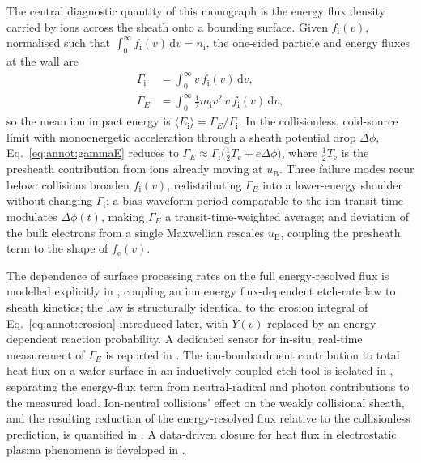 The central diagnostic quantity of this monograph is the energy flux density carried by ions across the sheath onto a bounding surface. Given $f_{\mathrm{i}}(v)$, normalised such that $\int_{0}^{\infty} f_{\mathrm{i}}(v)\,\mathrm{d}v = n_{\mathrm{i}}$, the one-sided particle and energy fluxes at the wall are
\begin{align}
\Gamma_{\mathrm{i}} &= \int_{0}^{\infty} v\, f_{\mathrm{i}}(v)\, \mathrm{d}v, \label{eq:annot:gammai}\\
\Gamma_{E} &= \int_{0}^{\infty} \tfrac{1}{2} m_{\mathrm{i}} v^{2}\, v\, f_{\mathrm{i}}(v)\, \mathrm{d}v, \label{eq:annot:gammaE}
\end{align}
so the mean ion impact energy is $\langle E_{\mathrm{i}} \rangle = \Gamma_{E}/\Gamma_{\mathrm{i}}$. In the collisionless, cold-source limit with monoenergetic acceleration through a sheath potential drop $\Delta\phi$, Eq.~\eqref{eq:annot:gammaE} reduces to $\Gamma_{E} \approx \Gamma_{\mathrm{i}} \bigl(\tfrac{1}{2}T_{\mathrm{e}} + e\Delta\phi\bigr)$, where $\tfrac{1}{2}T_{\mathrm{e}}$ is the presheath contribution from ions already moving at $u_{\mathrm{B}}$. Three failure modes recur below: collisions broaden $f_{\mathrm{i}}(v)$, redistributing $\Gamma_{E}$ into a lower-energy shoulder without changing $\Gamma_{\mathrm{i}}$; a bias-waveform period comparable to the ion transit time modulates $\Delta\phi(t)$, making $\Gamma_{E}$ a transit-time-weighted average; and deviation of the bulk electrons from a single Maxwellian rescales $u_{\mathrm{B}}$, coupling the presheath term to the shape of $f_{\mathrm{e}}(v)$.

The dependence of surface processing rates on the full energy-resolved flux is modelled explicitly in \cite{ref0074}, coupling an ion energy flux-dependent etch-rate law to sheath kinetics; the law is structurally identical to the erosion integral of Eq.~\eqref{eq:annot:erosion} introduced later, with $Y(v)$ replaced by an energy-dependent reaction probability. A dedicated sensor for in-situ, real-time measurement of $\Gamma_{E}$ is reported in \cite{ref0075}. The ion-bombardment contribution to total heat flux on a wafer surface in an inductively coupled etch tool is isolated in \cite{ref0080}, separating the energy-flux term from neutral-radical and photon contributions to the measured load. Ion-neutral collisions' effect on the weakly collisional sheath, and the resulting reduction of the energy-resolved flux relative to the collisionless prediction, is quantified in \cite{ref0077}. A data-driven closure for heat flux in electrostatic plasma phenomena is developed in \cite{ref0101}.

